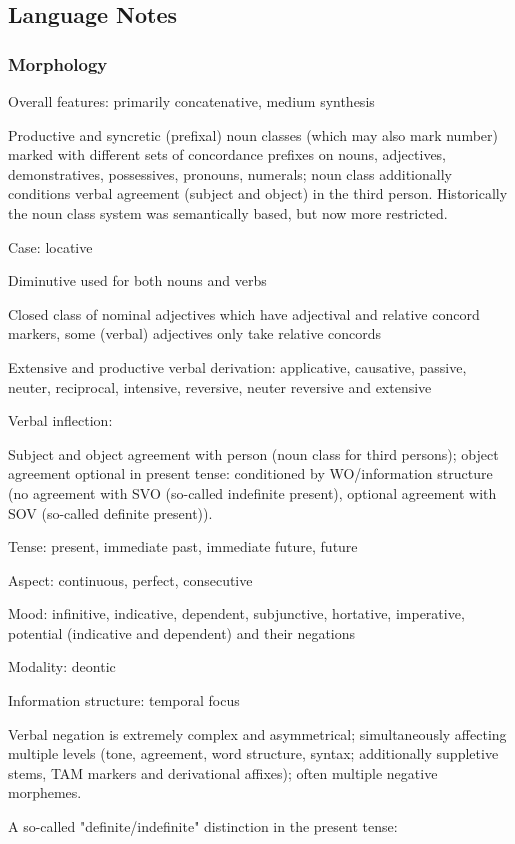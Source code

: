 \documentclass[a4paper, 11pt]{book}
\begin{document}

\subsection{Language Notes}

\subsubsection*{Morphology}

\begin{itemize*}
\item Overall features: primarily concatenative, medium synthesis
\item Productive and syncretic (prefixal) noun classes (which may also mark number) marked with different sets of concordance prefixes on nouns, adjectives, demonstratives, possessives, pronouns, numerals; noun class additionally conditions verbal agreement (subject and object) in the third person. Historically the noun class system was semantically based, but now more restricted.
\item Case: locative
\item Diminutive used for both nouns and verbs
\item Closed class of nominal adjectives which have adjectival and relative concord markers, some (verbal) adjectives only take relative concords
\item Extensive and productive verbal derivation: applicative, causative, passive, neuter, reciprocal, intensive, reversive, neuter reversive and extensive
\item Verbal inflection:
  \begin{itemize*}
	\item Subject and object agreement with person (noun class for third persons); object agreement optional in present tense: conditioned by WO/information structure (no agreement with SVO (so-called indefinite present), optional agreement with SOV (so-called definite present)).
	\item Tense: present, immediate past, immediate future, future
	\item Aspect: continuous, perfect, consecutive
	\item Mood: infinitive, indicative, dependent, subjunctive, hortative, imperative, potential 	(indicative and dependent) and their negations
	\item Modality: deontic
	\item Information structure: temporal focus
  \end{itemize*}
\item Verbal negation is extremely complex and asymmetrical; simultaneously affecting multiple levels (tone, agreement, word structure, syntax; additionally suppletive stems, TAM markers and derivational affixes); often multiple negative morphemes.
\item A so-called "definite/indefinite" distinction in the present tense: 
\end{itemize*}
\end{document}

